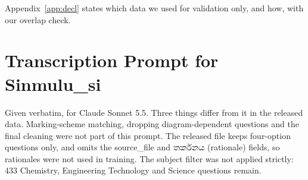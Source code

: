 \documentclass[11pt]{article}
\newcommand{\sinhalatext}[1]{{\sinhalafont #1}}
\newcommand{\sinmulu}{Sinmulu\_si}
\begin{document}
Appendix~\ref{app:decl} states which data we used for validation only, and how, with our overlap check.



\onecolumn
\appendix
\renewcommand{\thesection}{\Alph{section}}



\section{Transcription Prompt for \sinmulu{}}\label{app:prompt}
Given verbatim, for Claude Sonnet 5.5. Three things differ from it in the released data. Marking-scheme matching, dropping diagram-dependent questions and the final cleaning were not part of this prompt. The released file keeps four-option questions only, and omits the source\_file and \sinhalatext{තර්කනය} (rationale) fields, so rationales were not used in training. The subject filter was not applied strictly: 433 Chemistry, Engineering Technology and Science questions remain.

\medskip
{\footnotesize\ttfamily\raggedright\setlength{\parindent}{0pt}\setlength{\parskip}{1pt}

\par}
\end{document}
